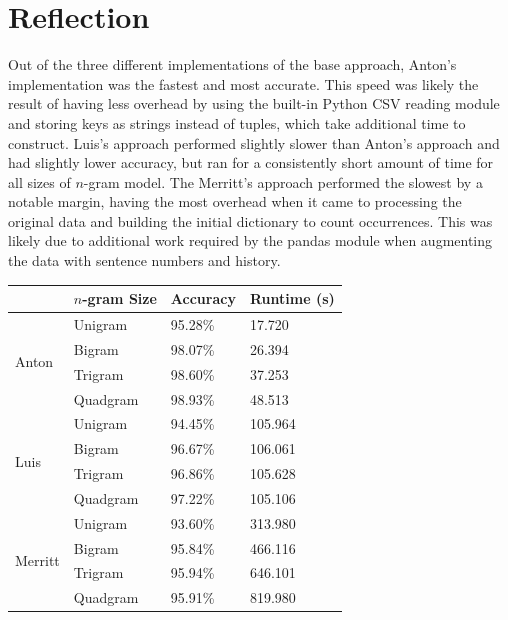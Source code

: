 \documentclass{article}
\begin{document}
\pagebreak
\section{Reflection}

Out of the three different implementations of the base approach, Anton's implementation was the fastest and most accurate. This speed was likely the result of having less overhead by using the built-in Python CSV reading module and storing keys as strings instead of tuples, which take additional time to construct. Luis's approach performed slightly slower than Anton's approach and had slightly lower accuracy, but ran for a consistently short amount of time for all sizes of $n$-gram model. The Merritt's approach performed the slowest by a notable margin, having the most overhead when it came to processing the original data and building the initial dictionary to count occurrences. This was likely due to additional work required by the pandas module when augmenting the data with sentence numbers and history.

\vspace{1cm}
\noindent
\begin{tabular}{|m{4cm}|m{4cm}|m{3cm}|m{3cm}|}
    \hline
    \textbf{} & \textbf{$n$-gram Size} & \textbf{Accuracy} & \textbf{Runtime (s)} \\
    \hline\hline
    \multirow{4}{*}{Anton}  & Unigram & 95.28\% & 17.720 \\
                            \cline{2-4}
                            & Bigram & 98.07\% & 26.394 \\
                            \cline{2-4}
                            & Trigram & 98.60\% & 37.253 \\
                            \cline{2-4}
                            & Quadgram & 98.93\% & 48.513 \\
    \hline\hline
    \multirow{4}{*}{Luis}   & Unigram & 94.45\% & 105.964 \\
                            \cline{2-4}
                            & Bigram & 96.67\% & 106.061 \\
                            \cline{2-4}
                            & Trigram & 96.86\% & 105.628 \\
                            \cline{2-4}
                            & Quadgram & 97.22\% & 105.106 \\
    \hline\hline
    \multirow{4}{*}{Merritt}& Unigram & 93.60\% & 313.980 \\
                            \cline{2-4}
                            & Bigram & 95.84\% & 466.116 \\
                            \cline{2-4}
                            & Trigram & 95.94\% & 646.101 \\
                            \cline{2-4}
                            & Quadgram & 95.91\% & 819.980 \\
    \hline
\end{tabular}
\end{document}
